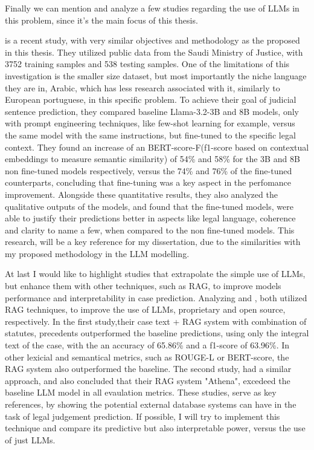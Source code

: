 \documentclass[11pt,a4paper,twoside,openright]{book}
\begin{document}
\par Finally we can mention and analyze a few studies regarding the use of LLMs in this problem, since it's the main focus of this thesis.
\par \textcite{kmainasi_can_2025} is a recent study, with very similar objectives and methodology as the proposed in this thesis.
They utilized public data from the Saudi Ministry of Justice, with 3752 training samples and 538 testing samples.
One of the limitations of this investigation is the smaller size dataset, but most importantly the niche language they are in, Arabic, which has less research associated with it, similarly to European portuguese, in this specific problem. 
To achieve their goal of judicial sentence prediction, they compared baseline Llama-3.2-3B and 8B models, only with prompt engineering techniques, like few-shot learning for example, versus the same model with the same instructions, but fine-tuned to the specific legal context.
They found an increase of an BERT-score-F(f1-score based on contextual embeddings to measure semantic similarity) of 54\% and 58\% for the 3B and 8B non fine-tuned models respectively, versus the 74\% and 76\% of the fine-tuned counterparts, concluding that fine-tuning was a key aspect in the perfomance improvement. 
Alongside these quantitative results, they also analyzed the qualitative outputs of the models, and found that the fine-tuned models, were able to justify their predictions better in aspects like legal language, coherence and clarity to name a few, when compared to the non fine-tuned models.
This research, will be a key reference for my dissertation, due to the similarities with my proposed methodology in the LLM modelling.

\par At last I would like to highlight studies that extrapolate the simple use of LLMs, but enhance them with other techniques, such as RAG, to improve models performance and interpretability in case prediction.
Analyzing \textcite{nigam_nyayarag_2025} and \textcite{peng_athena_2024}, both utilized RAG techniques, to improve the use of LLMs, proprietary and open source, respectively.
In the first study,their case text + RAG system with combination of statutes, precedents outperformed the baseline predictions, using only the integral text of the case, with the an accuracy of 65.86\% and a f1-score of 63.96\%. 
In other lexicial and semantical metrics, such as ROUGE-L or BERT-score, the RAG system also outperformed the baseline.
The second study, had a similar approach, and also concluded that their RAG system "Athena", excedeed the baseline LLM model in all evaulation metrics.
These studies, serve as key references, by showing the potential external database systems can have in the task of legal judgement prediction. 
If possible, I will try to implement this technique and compare its predictive but also interpretable power, versus the use of just LLMs.
\end{document}

